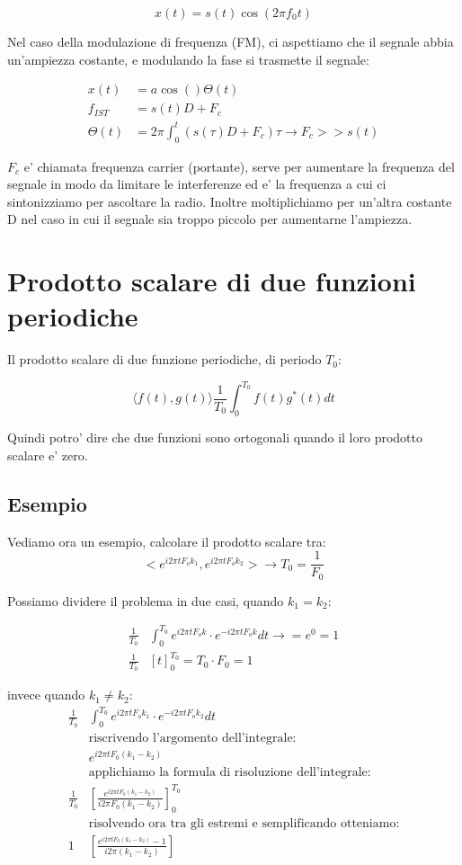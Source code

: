 \[
    x(t) = s(t) \cos{(2\pi f_0 t)}
\]

Nel caso della modulazione di frequenza (FM), ci aspettiamo che il segnale abbia un'ampiezza costante, e modulando la fase si trasmette il segnale:

\[\begin{split}
    x(t) &= a \cos{()\Theta(t)} \\
    f_{IST} &= s(t) D + F_c \\
    \Theta(t) &= 2\pi \int_0^t (s(\tau) D + F_c) \tau \rightarrow F_c >> s(t)
\end{split}\]

$F_c$ e' chiamata frequenza carrier (portante), serve per aumentare la frequenza del segnale in modo da limitare le interferenze ed e' la frequenza a cui ci sintonizziamo per ascoltare la radio. Inoltre moltiplichiamo per un'altra costante D nel caso in cui il segnale sia troppo piccolo per aumentarne l'ampiezza.


\section{Prodotto scalare di due funzioni periodiche}
Il prodotto scalare di due funzione periodiche, di periodo $T_0$:

\[
    \langle f(t), g(t)\rangle \frac{1}{T_0} \int_0^{T_0} f(t) g^*(t) dt
\]

Quindi potro' dire che due funzioni sono ortogonali quando il loro prodotto scalare e' zero.

\subsection{Esempio}
Vediamo ora un esempio, calcolare il prodotto scalare tra:
\[
    <e^{i2\pi t F_o k_1}, e^{i2\pi t F_o k_2}> \rightarrow T_0 = \frac{1}{F_0}
\]

Possiamo dividere il problema in due casi, quando $k_1 = k_2$:

\[\begin{split}
    \frac{1}{T_0} &\int_0^{T_0} e^{i2\pi t F_o k} \cdot e^{-i2\pi t F_o k} dt \rightarrow = e^0 = 1 \\
    \frac{1}{T_0} &[t]_0^{T_0} = T_0 \cdot F_0 = 1
\end{split}\]

invece quando $k_1 \neq k_2$:
\[\begin{split}
    \frac{1}{T_0} &\int_0^{T_0} e^{i2\pi t F_o k_1} \cdot e^{-i2\pi t F_o k_2} dt \\
    &\mbox{riscrivendo l'argomento dell'integrale:} \\
    &e^{i2\pi t F_0(k_1 - k_2)}\\
    &\mbox{applichiamo la formula di risoluzione dell'integrale:}\\
    \frac{1}{T_0} &[\frac{e^{i2\pi t F_0(k_1 - k_2)}}{i2\pi F_0(k_1 - k_2)}]_0^{T_0} \\
    &\mbox{risolvendo ora tra gli estremi e semplificando otteniamo:}\\
    1 &[\frac{e^{i2\pi t F_0(k_1 - k_2)}-1}{i2\pi (k_1 - k_2)}] \\
\end{split}\]

